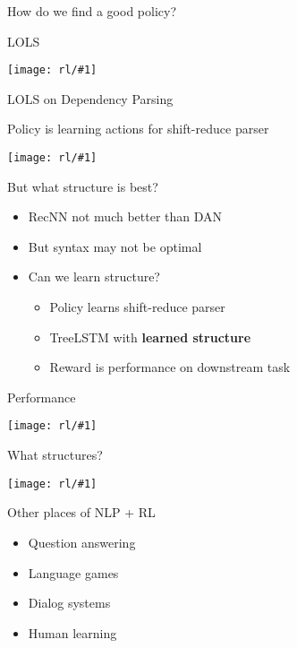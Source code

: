 \documentclass[compress]{beamer}
\newcommand{\gfx}[2]{
\begin{center}
	\texttt{[image: rl/\#1]}
\end{center}
}
\begin{document}
\begin{frame}{How do we find a good policy?}
  \only<1>{\gfx{searn_1}{.8}}
  \only<2>{\gfx{searn_2}{.8}}
  \only<3>{\gfx{searn_3}{.8}}
  \only<4>{\gfx{searn_4}{.8}}
  \only<5>{\gfx{searn_5}{.8}}
  \only<6>{\gfx{searn_6}{.8}}
  \only<7>{\gfx{searn_7}{.8}}
  \only<8>{\gfx{searn_8}{.8}}
  \only<9>{\gfx{searn_9}{.8}}
\end{frame}


\begin{frame}{LOLS}
  \gfx{lols}{.8}
\end{frame}

\begin{frame}{LOLS on Dependency Parsing}

  Policy is learning actions for shift-reduce parser
  \gfx{lols-dp-results}{.7}

\end{frame}

\begin{frame}{But what structure is best?}

  \begin{itemize}
    \item RecNN not much better than DAN
    \item But syntax may not be optimal
    \item Can we learn structure?
      \pause
      \begin{itemize}
        \item Policy learns shift-reduce parser
        \item TreeLSTM with {\bf learned structure}
        \item Reward is performance on downstream task
      \end{itemize}
  \end{itemize}

\end{frame}

\begin{frame}{Performance}

  \gfx{learned-tree-results}{.8}

\end{frame}

\begin{frame}{What structures?}

  \gfx{learned-tree}{.8}

\end{frame}


\begin{frame}{Other places of NLP + RL}

  \begin{itemize}
    \item Question answering
    \item Language games
    \item Dialog systems
    \item Human learning
  \end{itemize}

\end{frame}
\end{document}
